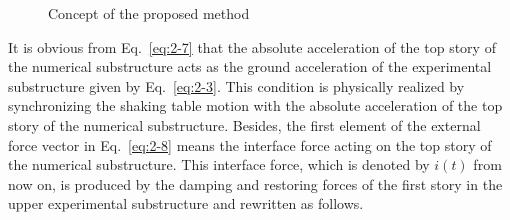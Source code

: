 \begin{figure}[ht]
\centering
{}\hfill
 \hfill
\caption{Concept of the proposed method}
\label{fig:2-3}
\end{figure}

It is obvious from Eq.~\eqref{eq:2-7} that the absolute acceleration of the top story of the numerical substructure acts as the ground acceleration of the experimental substructure given by Eq.~\eqref{eq:2-3}. This condition is physically realized by synchronizing the shaking table motion with the absolute acceleration of the top story of the numerical substructure. Besides, the first element of the external force vector in Eq.~\eqref{eq:2-8} means the interface force acting on the top story of the numerical substructure. This interface force, which is denoted by $i(t)$ from now on, is produced by the damping and restoring forces of the first story in the upper experimental substructure and rewritten as follows.

